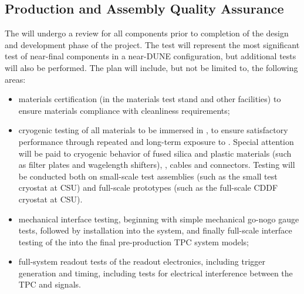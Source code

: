 \subsection{Production and Assembly Quality Assurance}
\label{sec:fdsp-pd-prodqa}

The  will undergo a  review for all components prior to completion of the design and development phase of the project.  The  test will represent the most significant test of near-final  components in a near-DUNE configuration, but additional tests will also be performed.  The  plan will include, but not be limited to, the following areas:

\begin{itemize}
\item materials certification (in the  materials test stand and other facilities) to ensure materials compliance with cleanliness requirements;
\item cryogenic testing of all materials to be immersed in \lar, to ensure satisfactory performance through repeated and long-term exposure to \lar{}.  Special attention will be paid to cryogenic behavior of fused silica and plastic materials (such as filter plates and wagelength shifters), , cables and connectors.  Testing will be conducted both on small-scale test assemblies (such as the small test cryostat at CSU) and full-scale prototypes (such as the full-scale CDDF cryostat at CSU). 
\item mechanical interface testing, beginning with simple mechanical go-nogo gauge tests, followed by installation into the  system, and finally full-scale interface testing of the  into the final pre-production TPC system models;
\item full-system readout tests of the  readout electronics, including trigger generation and timing, including tests for electrical interference between the TPC and  signals.
\end{itemize}


